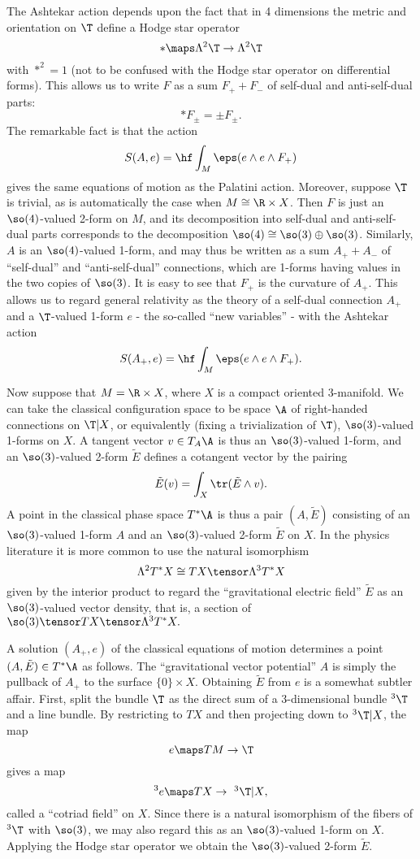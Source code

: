 The Ashtekar action depends upon the fact that in 4 dimensions the metric
and orientation on $\T$ define a Hodge star operator
\[           \ast \maps \Lambda^2 \T \to \Lambda^2 \T \]
with $\ast^2 = 1$ (not to be confused with the Hodge star operator on
differential forms).   This allows us to write $F$ as a sum  $F_+
+ F_-$ of self-dual and anti-self-dual parts:
\[\ast F_{\pm} = \pm F_{\pm}.\]
The remarkable fact is that the action
\[        S(A,e) = \hf \int_M  \eps(e \wedge e \wedge F_+) \]
gives the same equations of motion as
the Palatini action.  Moreover, suppose $\T$ is trivial, as is
automatically the case when $M \cong \R \times X$.
Then $F$ is just an $\so(4)$-valued 2-form on
$M$, and its decomposition into self-dual and anti-self-dual parts
corresponds to the decomposition $\so(4) \cong \so(3) \oplus \so(3)$.
Similarly, $A$ is an $\so(4)$-valued 1-form, and may  thus be written as a
sum $A_+ + A_-$ of ``self-dual'' and ``anti-self-dual'' connections, which
are 1-forms having values in the two copies of $\so(3)$.   It is easy to
see that $F_+$ is the curvature of $A_+$.  This allows us to  regard
general relativity as the theory of a self-dual connection $A_+$ and a
$\T$-valued 1-form  $e$ - the so-called ``new variables'' - with the Ashtekar
action
\[        S(A_+,e) = \hf \int_M \eps(e \wedge e \wedge F_+) .\]

Now suppose that $M = \R \times X$, where $X$ is a compact oriented
3-manifold.  We can take the
classical configuration space to be space $\A$ of right-handed connections
on $\T|X$, or equivalently (fixing a trivialization of $\T$),
$\so(3)$-valued 1-forms on $X$.  A tangent vector $v \in T_A\A$ is thus an
$\so(3)$-valued 1-form, and an $\so(3)$-valued 2-form $\tilde E$ defines a
cotangent vector by the pairing
\[        \tilde E(v) = \int_X \tr(\tilde E\wedge v) .\]
A point in the classical phase space $T^\ast \A$ is thus a pair $(A,\tilde
E)$ consisting of an $\so(3)$-valued 1-form $A$ and an $\so(3)$-valued
2-form $\tilde E$ on $X$.
In the physics literature it is more common to use the natural isomorphism
\[         \Lambda^2 T^\ast X \cong TX \tensor \Lambda^3 T^\ast X \]
given by the interior product to regard the ``gravitational electric
field'' $\tilde E$ as an $\so(3)$-valued vector density, that is, a section
of $\so(3) \tensor TX \tensor \Lambda^3 T^\ast X .$

A solution $(A_+,e)$ of the classical equations of motion determines a
point $(A,\tilde E) \in T^\ast \A$ as follows.   The ``gravitational vector
potential'' $A$ is simply the
pullback of $A_+$ to the surface $\{0\} \times X$.  Obtaining $\tilde E$
from $e$ is a somewhat subtler affair.  First, split the bundle $\T$ as the
direct sum of a 3-dimensional bundle $^3\T$ and a line bundle.
By restricting to $TX$ and then projecting down to $^3\T|X$, the map
\[      e \maps TM \to \T \]
gives a map
\[       ^3 e \maps TX \to \hbox{ $^3\T|X$}, \]
called a ``cotriad field'' on $X$.  Since there is a natural isomorphism of
the fibers of $^3\T$ with $\so(3)$, we may also regard this as an
$\so(3)$-valued 1-form on $X$.  Applying the Hodge star operator we obtain
the $\so(3)$-valued 2-form $\tilde E$.

